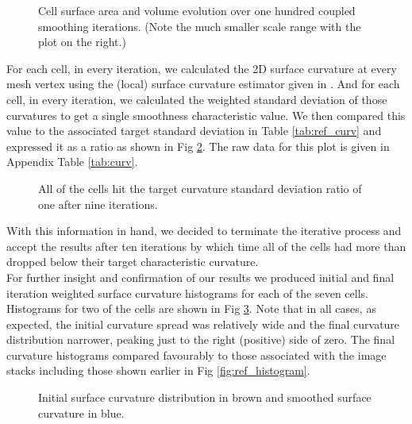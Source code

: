 \documentclass[10pt,letterpaper]{article}
\begin{document}
\begin{figure}[h!]
\caption{Cell surface area and volume evolution over one hundred coupled smoothing iterations. (Note the much smaller scale range with the plot on the right.)}
\label{fig:100_iterations}
\end{figure}

For each cell, in every iteration, we calculated the 2D surface curvature at every mesh vertex using the (local) surface curvature estimator given in \cite{Rugis_2008_DSC}. And for each cell, in every iteration, we calculated the weighted standard deviation of those curvatures to get a single smoothness characteristic value. We then compared this value to the associated target standard deviation in Table \ref{tab:ref_curv} and expressed it as a ratio as shown in Fig \ref{fig:curv_std}. The raw data for this plot is given in Appendix Table \ref{tab:curv}.\\

\begin{figure}[h!]
\caption{All of the cells hit the target curvature standard deviation ratio of one after nine iterations.}
\label{fig:curv_std}
\end{figure}

With this information in hand, we decided to terminate the iterative process and accept the results after ten iterations by which time all of the cells had more than dropped below their target characteristic curvature.\\

For further insight and confirmation of our results we produced initial and final iteration weighted surface curvature histograms for each of the seven cells. Histograms for two of the cells are shown in Fig \ref{fig:morph_histogram}. Note that in all cases, as expected, the initial curvature spread was relatively wide and the final curvature distribution narrower, peaking just to the right (positive) side of zero. The final curvature histograms compared favourably to those associated with the image stacks including those shown earlier in Fig \ref{fig:ref_histogram}.\\

\begin{figure}[h!]
\caption{Initial surface curvature distribution in brown and smoothed surface curvature in blue.}
\label{fig:morph_histogram}
\end{figure}
\end{document}
